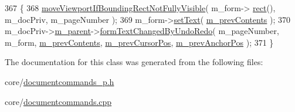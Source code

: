 \begin{DoxyCode}
367 \{
368     \hyperlink{namespaceOkular_a1e0f22fec5a200bd3b1835b7bfd95172}{moveViewportIfBoundingRectNotFullyVisible}( m\_form->
      \hyperlink{classOkular_1_1FormField_a76014a9315921056764c72dd17b81339}{rect}(), m\_docPriv, m\_pageNumber );
369     m\_form->\hyperlink{classOkular_1_1FormFieldText_ab67ad787fc119bdf87281d07339e310c}{setText}( \hyperlink{classOkular_1_1EditTextCommand_a461d065fa44222a7c94a23ce2df39188}{m\_prevContents} );
370     m\_docPriv->\hyperlink{classOkular_1_1DocumentPrivate_ac921eda41c014869ffec96ecc569c713}{m\_parent}->\hyperlink{classOkular_1_1Document_af534e0e010225b2a57319845442888bb}{formTextChangedByUndoRedo}( m\_pageNumber, m\_form, 
      \hyperlink{classOkular_1_1EditTextCommand_a461d065fa44222a7c94a23ce2df39188}{m\_prevContents}, \hyperlink{classOkular_1_1EditTextCommand_a5bc4e5af11ce42281c590750e0c75b51}{m\_prevCursorPos}, \hyperlink{classOkular_1_1EditTextCommand_afe5d2bc5003ae94ec364eeabd5789e64}{m\_prevAnchorPos} );
371 \}
\end{DoxyCode}


The documentation for this class was generated from the following files\+:\begin{DoxyCompactItemize}
\item 
core/\hyperlink{documentcommands__p_8h}{documentcommands\+\_\+p.\+h}\item 
core/\hyperlink{documentcommands_8cpp}{documentcommands.\+cpp}\end{DoxyCompactItemize}

